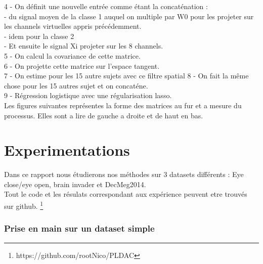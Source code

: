 \documentclass{article}[12pt]
\begin{document}
4 - On définit une nouvelle entrée comme étant la concaténation :\\
- du signal moyen de la classe 1 auquel on multiple par W0 pour les projeter sur les channels virtuelles appris précédemment.\\
- idem pour la classe 2\\
- Et ensuite le signal Xi projeter sur les 8 channels.\\
5 - On calcul la covariance de cette matrice.\\
6 - On projette cette matrice sur l'espace tangent.\\
7 - On estime pour les 15 autre sujets avec ce filtre spatial
8 - On fait la même chose pour les 15 autres sujet et on concaténe.\\
9 - Régression logistique avec une régularisation lasso.\\
Les figures suivantes représentes la forme des matrices au fur et a mesure du processus. Elles sont a lire de gauche a droite et de haut en bas.
\\


\part{Experimentations}
Dans ce rapport nous étudierons nos méthodes sur 3 datasets différents : Eye close/eye open, brain invader et DecMeg2014.\\
Tout le code et les résulats correspondant aux expérience peuvent etre trouvés sur github. \footnote{https://github.com/rootNico/PLDAC}
\section{Prise en main sur un dataset simple}
\end{document}
